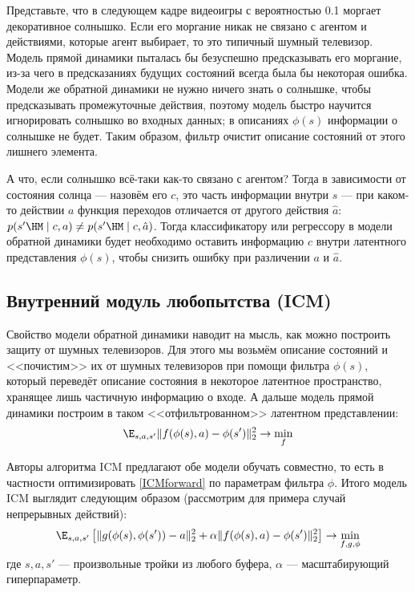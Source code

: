 \begin{example}
Представьте, что в следующем кадре видеоигры с вероятностью 0.1 моргает декоративное солнышко. Если его моргание никак не связано с агентом и действиями, которые агент выбирает, то это типичный шумный телевизор. Модель прямой динамики пыталась бы безуспешно предсказывать его моргание, из-за чего в предсказаниях будущих состояний всегда была бы некоторая ошибка. Модели же обратной динамики не нужно ничего знать о солнышке, чтобы предсказывать промежуточные действия, поэтому модель быстро научится игнорировать солнышко во входных данных; в описаниях $\phi(s)$ информации о солнышке не будет. Таким образом, фильтр очистит описание состояний от этого лишнего элемента.

А что, если солнышко всё-таки как-то связано с агентом? Тогда в зависимости от состояния солнца --- назовём его $c$, это часть информации внутри $s$ --- при каком-то действии $a$ функция переходов отличается от другого действия $\hat{a}$: $p(s' \HM \mid c, a) \neq p(s' \HM \mid c, \hat{a})$. Тогда классификатору или регрессору в модели обратной динамики будет необходимо оставить информацию $c$ внутри латентного представления $\phi(s)$, чтобы снизить ошибку при различении $a$ и $\hat{a}$.
\end{example}

\subsection{Внутренний модуль любопытства (ICM)}

Свойство модели обратной динамики наводит на мысль, как можно построить защиту от шумных телевизоров. Для этого мы возьмём описание состояний и <<почистим>> их от шумных телевизоров при помощи фильтра $\phi(s)$, который переведёт описание состояния в некоторое латентное пространство, хранящее лишь частичную информацию о входе. А дальше модель прямой динамики построим в таком <<отфильтрованном>> латентном представлении:
\begin{equation}\label{ICMforward}
\E_{s, a, s'} \|f(\phi(s), a) - \phi(s')\|^2_2 \to \min_{f}
\end{equation}

Авторы алгоритма ICM предлагают обе модели обучать совместно, то есть в частности оптимизировать \eqref{ICMforward} по параметрам фильтра $\phi$. Итого модель ICM выглядит следующим образом (рассмотрим для примера случай непрерывных действий):
$$\E_{s, a, s'} \left[ \|g(\phi(s), \phi(s')) - a\|^2_2 + \alpha \|f(\phi(s), a) - \phi(s')\|^2_2 \right] \to \min_{f, g, \phi}$$
где $s, a, s'$ --- произвольные тройки из любого буфера, $\alpha$ --- масштабирующий гиперпараметр. 

